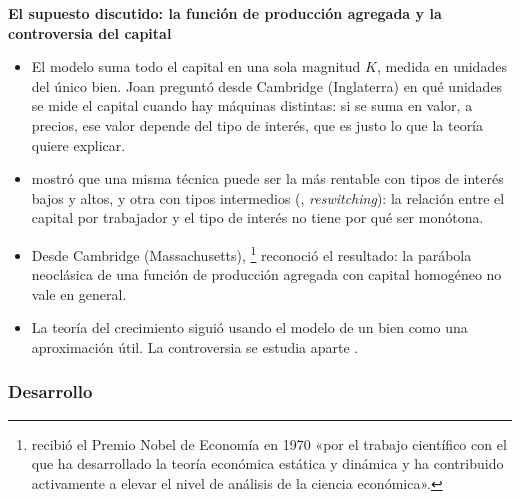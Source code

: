 \documentclass[11pt]{article}
\begin{document}
\begin{anotaciones}
\textbf{El supuesto discutido: la función de producción agregada y la controversia del capital}
\begin{itemize}
\item El modelo suma todo el capital en una sola magnitud $K$, medida en unidades del único bien. Joan \textcite{Robinson1953Production} preguntó desde Cambridge (Inglaterra) en qué unidades se mide el capital cuando hay máquinas distintas: si se suma en valor, a precios, ese valor depende del tipo de interés, que es justo lo que la teoría quiere explicar.
\item \textcite{Sraffa1960Production} mostró que una misma técnica puede ser la más rentable con tipos de interés bajos y altos, y otra con tipos intermedios (, \emph{reswitching}): la relación entre el capital por trabajador y el tipo de interés no tiene por qué ser monótona.
\item Desde Cambridge (Massachusetts), \textcite{Samuelson1966Summing}\footnote{ recibió el Premio Nobel de Economía en 1970 «por el trabajo científico con el que ha desarrollado la teoría económica estática y dinámica y ha contribuido activamente a elevar el nivel de análisis de la ciencia económica»\nocite{Nobel1970Samuelson}.} reconoció el resultado: la parábola neoclásica de una función de producción agregada con capital homogéneo no vale en general.
\item La teoría del crecimiento siguió usando el modelo de un bien como una aproximación útil. La controversia se estudia aparte .
\end{itemize}
\end{anotaciones}

\subsubsection{Desarrollo}
\end{document}
